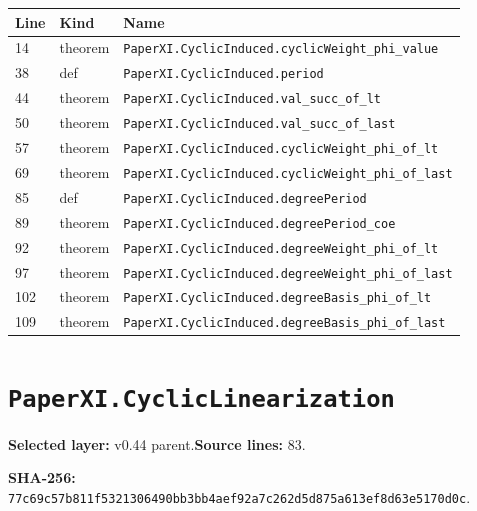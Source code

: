 \documentclass[10pt,oneside]{book}
\begin{document}
\begin{longtable}{@{}p{}p{}p{}@{}}\toprule Line&Kind&Name\\\midrule\endhead

14&theorem&\nolinkurl{PaperXI.CyclicInduced.cyclicWeight_phi_value}\\

38&def&\nolinkurl{PaperXI.CyclicInduced.period}\\

44&theorem&\nolinkurl{PaperXI.CyclicInduced.val_succ_of_lt}\\

50&theorem&\nolinkurl{PaperXI.CyclicInduced.val_succ_of_last}\\

57&theorem&\nolinkurl{PaperXI.CyclicInduced.cyclicWeight_phi_of_lt}\\

69&theorem&\nolinkurl{PaperXI.CyclicInduced.cyclicWeight_phi_of_last}\\

85&def&\nolinkurl{PaperXI.CyclicInduced.degreePeriod}\\

89&theorem&\nolinkurl{PaperXI.CyclicInduced.degreePeriod_coe}\\

92&theorem&\nolinkurl{PaperXI.CyclicInduced.degreeWeight_phi_of_lt}\\

97&theorem&\nolinkurl{PaperXI.CyclicInduced.degreeWeight_phi_of_last}\\

102&theorem&\nolinkurl{PaperXI.CyclicInduced.degreeBasis_phi_of_lt}\\

109&theorem&\nolinkurl{PaperXI.CyclicInduced.degreeBasis_phi_of_last}\\

\bottomrule\end{longtable}

\section{\texorpdfstring{\nolinkurl{PaperXI.CyclicLinearization}}{PaperXI.CyclicLinearization}}\label{module:PaperXI.CyclicLinearization}

\textbf{Selected layer:} v0.44 parent.\quad\textbf{Source lines:} 83.\par\textbf{SHA-256:} {\scriptsize\nolinkurl{77c69c57b811f5321306490bb3bb4aef92a7c262d5d875a613ef8d63e5170d0c}}.
\end{document}
